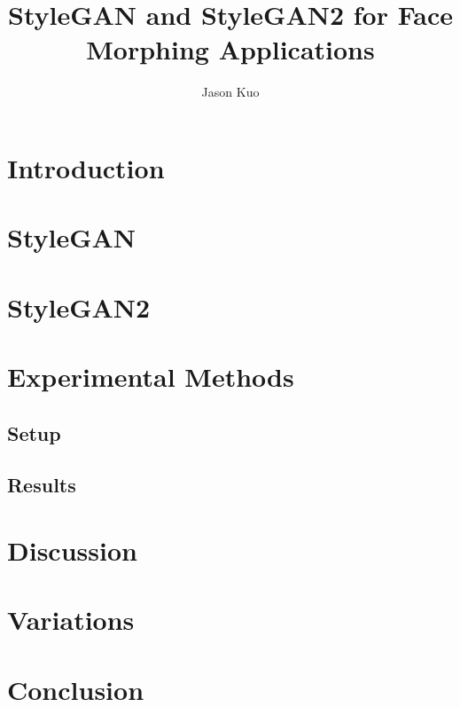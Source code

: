 \documentclass[12pt]{article}
\begin{document}
\title{StyleGAN and StyleGAN2 for Face Morphing Applications}
\author{Jason Kuo}
\date{}
\maketitle

\begin{abstract}
\end{abstract}

\section{Introduction}

\section{StyleGAN}

\section{StyleGAN2}

\section{Experimental Methods}

\subsection{Setup}

\subsection{Results}

\section{Discussion}

\section{Variations}

\section{Conclusion}
\end{document}
